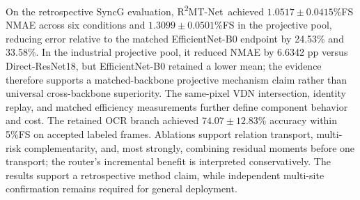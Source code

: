\documentclass[electronics,article,submit,oneauthor]{Definitions/mdpi}
\newcommand{\modelname}{R\textsuperscript{2}MT-Net}
\begin{document}
On the retrospective SyncG evaluation, \modelname\ achieved $1.0517\pm0.0415$\%FS NMAE across six conditions and $1.3099\pm0.0501$\%FS in the projective pool, reducing error relative to the matched EfficientNet-B0 endpoint by 24.53\% and 33.58\%. In the industrial projective pool, it reduced NMAE by 6.6342 pp versus Direct-ResNet18, but EfficientNet-B0 retained a lower mean; the evidence therefore supports a matched-backbone projective mechanism claim rather than universal cross-backbone superiority. The same-pixel VDN intersection, identity replay, and matched efficiency measurements further define component behavior and cost. The retained OCR branch achieved $74.07\pm12.83$\% accuracy within 5\%FS on accepted labeled frames. Ablations support relation transport, multi-risk complementarity, and, most strongly, combining residual moments before one transport; the router's incremental benefit is interpreted conservatively. The results support a retrospective method claim, while independent multi-site confirmation remains required for general deployment.

\vspace{6pt}




\end{document}

